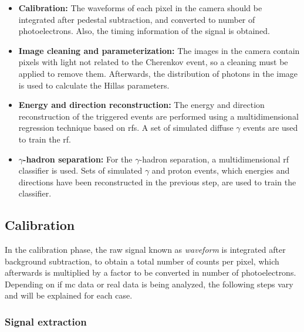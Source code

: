 \documentclass[main.tex]{subfiles}
\begin{document}
\begin{itemize}
\item\textbf{Calibration:} The waveforms of each pixel in the camera should be integrated after pedestal subtraction, and converted to number of photoelectrons. Also, the timing information of the signal is obtained. 
\item\textbf{Image cleaning and parameterization:} The images in the camera contain pixels with light not related to the Cherenkov event, so a cleaning must be applied to remove them. Afterwards, the distribution of photons in the image is used to calculate the Hillas parameters.
\item\textbf{Energy and direction reconstruction:} The energy and direction reconstruction of the triggered events are performed using a multidimensional regression technique based on \glspl{rf}. A set of simulated diffuse $\gamma$ events are used to train the \gls{rf}. 
\item\textbf{$\gamma$-hadron separation:} For the $\gamma$-hadron separation, a multidimensional \gls{rf} classifier is used. Sets of simulated $\gamma$ and proton events, which energies and directions have been reconstructed in the previous step, are used to train the classifier.
\end{itemize}

\subsection{Calibration} \label{sec:calib}

In the calibration phase, the raw signal known as \textit{waveform} is integrated after background subtraction, to obtain a total number of counts per pixel, which afterwards is multiplied by a factor to be converted in number of photoelectrons. Depending on if \gls{mc} data or real data is being analyzed, the following steps vary and will be explained for each case.

\subsubsection{Signal extraction} \label{sec:signalext}
\end{document}
